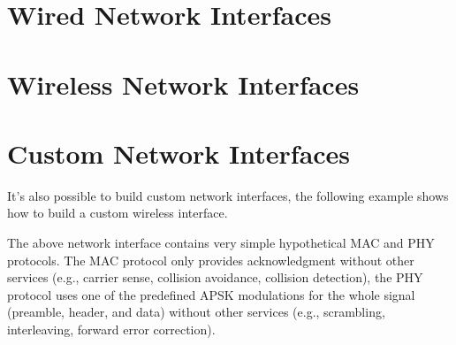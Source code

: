 \section{Wired Network Interfaces}


\section{Wireless Network Interfaces}


\section{Custom Network Interfaces}

It's also possible to build custom network interfaces, the following
example shows how to build a custom wireless interface.


The above network interface contains very simple hypothetical MAC and PHY
protocols. The MAC protocol only provides acknowledgment without other
services (e.g., carrier sense, collision avoidance, collision detection),
the PHY protocol uses one of the predefined APSK modulations for the whole
signal (preamble, header, and data) without other services (e.g.,
scrambling, interleaving, forward error correction).




